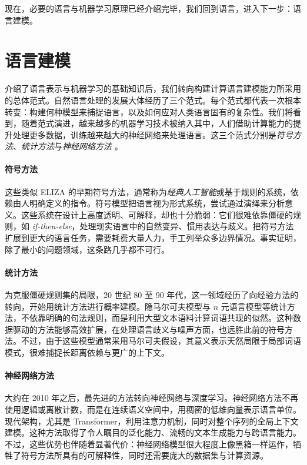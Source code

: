 现在，必要的语言与机器学习原理已经介绍完毕，我们回到语言，进入下一步：语言建模。

\section{语言建模}\label{sec:modernNLP}
介绍了语言表示与机器学习的基础知识后，我们转向构建计算语言建模能力所采用的总体范式。自然语言处理的发展大体经历了三个范式。每个范式都代表一次根本转变：构建何种模型来捕捉语言，以及如何应对人类语言固有的复杂性。我们将看到，随着范式演进，越来越多的机器学习技术被纳入其中，人们借助计算能力的提升处理更多数据，训练越来越大的神经网络来处理语言。这三个范式分别是\textit{符号方法}、\textit{统计方法}与\textit{神经网络方法} \citep{kautz2020third, deng2018deep}。

\paragraph{符号方法} 这些类似 ELIZA 的早期符号方法，通常称为\textit{经典人工智能}或基于规则的系统，依赖由人明确定义的指令。符号模型把语言视为形式系统，尝试通过演绎来分析意义。这些系统在设计上高度透明、可解释，却也十分脆弱：它们很难依靠僵硬的规则，如 \textit{if-then-else}，处理现实语言中的自然变异、惯用表达与歧义。把符号方法扩展到更大的语言任务，需要耗费大量人力，手工列举众多边界情况。事实证明，除了最小的问题领域，这条路几乎都不可行。

\paragraph{统计方法} 为克服僵硬规则集的局限，20 世纪 80 至 90 年代，这一领域经历了向经验方法的转向，开始用统计方法进行概率建模。隐马尔可夫模型与 $n$ 元语言模型等统计方法，不依靠明确的句法规则，而是利用大型文本语料计算词语共现的似然。这种数据驱动的方法能够高效扩展，在处理语言歧义与噪声方面，也远胜此前的符号方法。不过，由于这些模型通常采用马尔可夫假设，其意义表示天然局限于局部词语模式，很难捕捉长距离依赖与更广的上下文。

\paragraph{神经网络方法} 大约在 2010 年之后，最先进的方法转向神经网络与深度学习。神经网络方法不再使用逻辑或离散计数，而是在连续语义空间中，用稠密的低维向量表示语言单位。现代架构，尤其是 Transformer，利用注意力机制，同时对整个序列的全局上下文建模。这种方法取得了令人瞩目的泛化能力、流畅的文本生成能力与跨语言能力。不过，这些优势也伴随着显著代价：神经网络模型很大程度上像黑箱一样运作，牺牲了符号方法所具有的可解释性，同时还需要庞大的数据集与计算资源。

